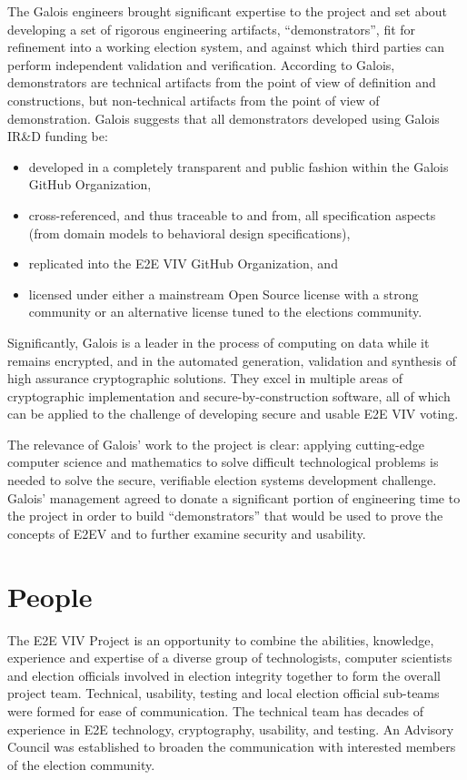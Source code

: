 The Galois engineers brought significant expertise to the project and
set about developing a set of rigorous engineering artifacts,
``demonstrators'', fit for refinement into a working election system,
and against which third parties can perform independent validation and
verification. According to Galois, demonstrators are technical
artifacts from the point of view of definition and constructions, but
non-technical artifacts from the point of view of
demonstration. Galois suggests that all demonstrators developed using
Galois IR\&D funding be:
\begin{itemize}
\item developed in a completely transparent and public fashion within
  the Galois GitHub Organization,
\item cross-referenced, and thus traceable to and from, all
  specification aspects (from domain models to behavioral design
  specifications),
\item replicated into the E2E VIV GitHub Organization, and
\item licensed under either a mainstream Open Source license with a
  strong community or an alternative license tuned to the elections
  community.
\end{itemize}

Significantly, Galois is a leader in the process of computing on data
while it remains encrypted, and in the automated generation,
validation and synthesis of high assurance cryptographic
solutions. They excel in multiple areas of cryptographic
implementation and secure-by-construction software, all of which can
be applied to the challenge of developing secure and usable E2E VIV
voting.

The relevance of Galois’ work to the project is clear: applying
cutting-edge computer science and mathematics to solve difficult
technological problems is needed to solve the secure, verifiable
election systems development challenge. Galois’ management agreed to
donate a significant portion of engineering time to the project in
order to build “demonstrators” that would be used to prove the
concepts of E2EV and to further examine security and usability.

\section{People}
\label{sec:people}

The E2E VIV Project is an opportunity to combine the abilities,
knowledge, experience and expertise of a diverse group of
technologists, computer scientists and election officials involved in
election integrity together to form the overall project
team. Technical, usability, testing and local election official
sub-teams were formed for ease of communication. The technical team
has decades of experience in E2E technology, cryptography, usability,
and testing. An Advisory Council was established to broaden the
communication with interested members of the election community.

